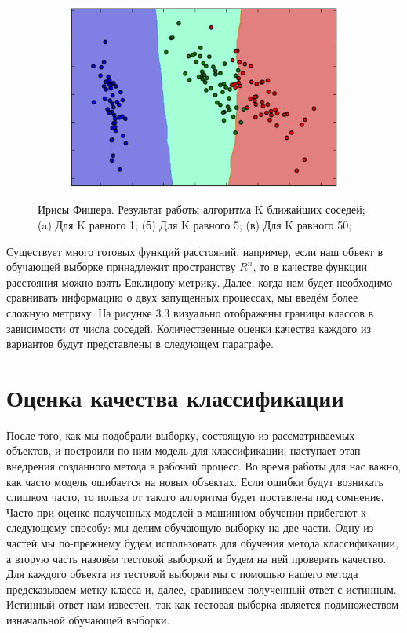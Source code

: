 \begin{figure}[ht]
\begin{subfigure}[b]{0.3\textwidth}
    \centering
        \includegraphics[scale=0.22]{pasted-image-25.png}
        \caption{}
    \end{subfigure}
    \caption{ Ирисы Фишера. Результат работы алгоритма K ближайших соседей; (a) Для K равного 1; (б) Для K равного 5; (в) Для K равного 50;}
    \label{fig_parsetree}
\end{figure}

Существует много готовых функций расстояний, например, если наш объект в обучающей выборке принадлежит пространству $R^n$, то в качестве функции расстояния можно взять Евклидову метрику.
Далее, когда нам будет необходимо сравнивать информацию о двух запущенных процессах, мы введём более сложную метрику.
На рисунке 3.3 визуально отображены границы классов в зависимости от числа соседей.
Количественные оценки качества каждого из вариантов будут представлены в следующем параграфе.

\section{Оценка качества классификации}

После того, как мы подобрали выборку, состоящую из рассматриваемых объектов, и построили по ним модель для классификации, наступает этап внедрения созданного метода в рабочий процесс. Во время работы для нас важно, как часто модель ошибается на новых объектах. Если ошибки будут возникать слишком часто, то польза от такого алгоритма будет поставлена под сомнение. 
Часто при оценке полученных моделей в машинном обучении прибегают к следующему способу: мы делим обучающую выборку на две части. Одну из частей мы по-прежнему будем использовать для обучения метода классификации, а вторую часть назовём тестовой выборкой и будем на ней проверять качество. Для каждого объекта из тестовой выборки мы с помощью нашего метода предсказываем метку класса и, далее, сравниваем полученный ответ с истинным. Истинный ответ нам известен, так как тестовая выборка является подмножеством изначальной обучающей выборки.

